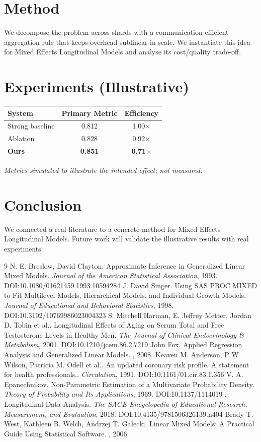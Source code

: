 \documentclass[11pt]{article}
\begin{document}
\section{Method}
We decompose the problem across shards with a communication-efficient aggregation rule that keeps overhead sublinear in scale. We instantiate this idea for Mixed Effects Longitudinal Models and analyse its cost/quality trade-off.

\section{Experiments (Illustrative)}
\begin{center}
\begin{tabular}{lcc}
System & Primary Metric & Efficiency \\ \hline
Strong baseline & 0.812 & 1.00$\times$ \\
Ablation & 0.828 & 0.92$\times$ \\
\textbf{Ours} & \textbf{0.851} & \textbf{0.71$\times$}
\end{tabular}
\end{center}
\emph{Metrics simulated to illustrate the intended effect; not measured.}

\section{Conclusion}
We connected a real literature to a concrete method for Mixed Effects Longitudinal Models. Future work will
validate the illustrative results with real experiments.

\begin{thebibliography}{9}
 N. E. Breslow, David Clayton. Approximate Inference in Generalized Linear Mixed Models. \emph{Journal of the American Statistical Association}, 1993. DOI:10.1080/01621459.1993.10594284
 J. David Singer. Using SAS PROC MIXED to Fit Multilevel Models, Hierarchical Models, and Individual Growth Models. \emph{Journal of Educational and Behavioral Statistics}, 1998. DOI:10.3102/10769986023004323
 S. Mitchell Harman, E. Jeffrey Metter, Jordan D. Tobin et al.. Longitudinal Effects of Aging on Serum Total and Free Testosterone Levels in Healthy Men. \emph{The Journal of Clinical Endocrinology \& Metabolism}, 2001. DOI:10.1210/jcem.86.2.7219
 John Fox. Applied Regression Analysis and Generalized Linear Models. \emph{}, 2008. 
 Keaven M. Anderson, P W Wilson, Patricia M. Odell et al.. An updated coronary risk profile. A statement for health professionals.. \emph{Circulation}, 1991. DOI:10.1161/01.cir.83.1.356
 V. A. Epanechnikov. Non-Parametric Estimation of a Multivariate Probability Density. \emph{Theory of Probability and Its Applications}, 1969. DOI:10.1137/1114019
 . Longitudinal Data Analysis. \emph{The SAGE Encyclopedia of Educational Research, Measurement, and Evaluation}, 2018. DOI:10.4135/9781506326139.n404
 Brady T. West, Kathleen B. Welch, Andrzej T. Gałecki. Linear Mixed Models: A Practical Guide Using Statistical Software. \emph{}, 2006. 
\end{thebibliography}
\end{document}
